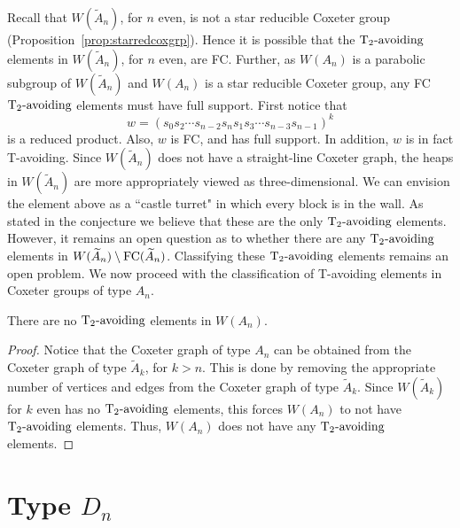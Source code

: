 Recall that $W(\widetilde{A}_n)$, for $n$ even, is not a star reducible Coxeter group (Proposition~\ref{prop:starredcoxgrp}). Hence it is possible that the $\operatorname{T_2-\mathrm{avoiding}}$ elements in $W(\widetilde{A}_n)$, for $n$ even, are FC. Further, as $W(A_n)$ is a parabolic subgroup of $W(\widetilde{A}_n)$ and $W(A_n)$ is a star reducible Coxeter group, any FC $\operatorname{T_2-\mathrm{avoiding}}$ elements must have full support. First notice that 
\[w=(s_0s_2 \cdots s_{n-2}s_ns_1s_3 \cdots s_{n-3}s_{n-1})^k\] 
is a reduced product. Also, $w$ is FC, and has full support. In addition, $w$ is in fact T-avoiding. Since $W(\widetilde{A}_n)$ does not have a straight-line Coxeter graph, the heaps in $W(\widetilde{A}_n)$ are more appropriately viewed as three-dimensional. We can envision the element above as a ``castle turret" in which every block is in the wall. As stated in the conjecture we believe that these are the only $\operatorname{T_2-\mathrm{avoiding}}$ elements. However, it remains an open question as to whether there are any $\operatorname{T_2-\mathrm{avoiding}}$ elements in $W(\widetilde{A}_n)\setminus \mathrm{FC}(\widetilde{A}_n)$. Classifying these $\operatorname{T_2-\mathrm{avoiding}}$ elements remains an open problem. We now proceed with the classification of T-avoiding elements in Coxeter groups of type $A_n$. 

\begin{theorem}
There are no $\operatorname{T_2-\mathrm{avoiding}}$ elements in $W(A_n)$. 
\begin{proof}
Notice that the Coxeter graph of type $A_n$ can be obtained from the Coxeter graph of type $\widetilde{A}_k$, for $k > n$. This is done by removing the appropriate number of vertices and edges from the Coxeter graph of type $\widetilde{A}_k$. Since $W(\widetilde{A}_k)$ for $k$ even has no $\operatorname{T_2-\mathrm{avoiding}}$ elements, this forces $W(A_n)$ to not have $\operatorname{T_2-\mathrm{avoiding}}$ elements. Thus, $W(A_n)$ does not have any $\operatorname{T_2-\mathrm{avoiding}}$ elements.  
\end{proof}
\end{theorem}



\section{Type $D_n$}


